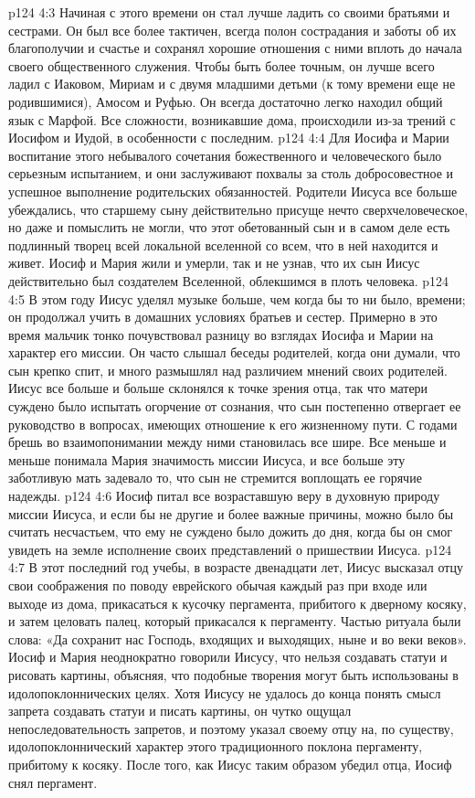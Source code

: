 \vs p124 4:3 Начиная с этого времени он стал лучше ладить со своими братьями и сестрами. Он был все более тактичен, всегда полон сострадания и заботы об их благополучии и счастье и сохранял хорошие отношения с ними вплоть до начала своего общественного служения. Чтобы быть более точным, он лучше всего ладил с Иаковом, Мириам и с двумя младшими детьми (к тому времени еще не родившимися), Амосом и Руфью. Он всегда достаточно легко находил общий язык с Марфой. Все сложности, возникавшие дома, происходили из\hyp{}за трений с Иосифом и Иудой, в особенности с последним.
\vs p124 4:4 \pc Для Иосифа и Марии воспитание этого небывалого сочетания божественного и человеческого было серьезным испытанием, и они заслуживают похвалы за столь добросовестное и успешное выполнение родительских обязанностей. Родители Иисуса все больше убеждались, что старшему сыну действительно присуще нечто сверхчеловеческое, но даже и помыслить не могли, что этот обетованный сын и в самом деле есть подлинный творец всей локальной вселенной со всем, что в ней находится и живет. Иосиф и Мария жили и умерли, так и не узнав, что их сын Иисус действительно был создателем Вселенной, облекшимся в плоть человека.
\vs p124 4:5 В этом году Иисус уделял музыке больше, чем когда бы то ни было, времени; он продолжал учить в домашних условиях братьев и сестер. Примерно в это время мальчик тонко почувствовал разницу во взглядах Иосифа и Марии на характер его миссии. Он часто слышал беседы родителей, когда они думали, что сын крепко спит, и много размышлял над различием мнений своих родителей. Иисус все больше и больше склонялся к точке зрения отца, так что матери суждено было испытать огорчение от сознания, что сын постепенно отвергает ее руководство в вопросах, имеющих отношение к его жизненному пути. С годами брешь во взаимопонимании между ними становилась все шире. Все меньше и меньше понимала Мария значимость миссии Иисуса, и все больше эту заботливую мать задевало то, что сын не стремится воплощать ее горячие надежды.
\vs p124 4:6 Иосиф питал все возраставшую веру в духовную природу миссии Иисуса, и если бы не другие и более важные причины, можно было бы считать несчастьем, что ему не суждено было дожить до дня, когда бы он смог увидеть на земле исполнение своих представлений о пришествии Иисуса.
\vs p124 4:7 \pc В этот последний год учебы, в возрасте двенадцати лет, Иисус высказал отцу свои соображения по поводу еврейского обычая каждый раз при входе или выходе из дома, прикасаться к кусочку пергамента, прибитого к дверному косяку, и затем целовать палец, который прикасался к пергаменту. Частью ритуала были слова: «Да сохранит нас Господь, входящих и выходящих, ныне и во веки веков». Иосиф и Мария неоднократно говорили Иисусу, что нельзя создавать статуи и рисовать картины, объясняя, что подобные творения могут быть использованы в идолопоклоннических целях. Хотя Иисусу не удалось до конца понять смысл запрета создавать статуи и писать картины, он чутко ощущал непоследовательность запретов, и поэтому указал своему отцу на, по существу, идолопоклоннический характер этого традиционного поклона пергаменту, прибитому к косяку. После того, как Иисус таким образом убедил отца, Иосиф снял пергамент.
